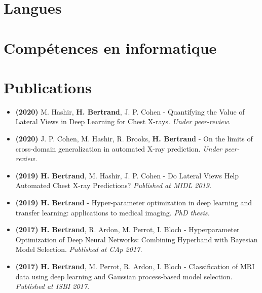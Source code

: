 \documentclass[11pt,a4paper,sans]{moderncv}        %
\begin{document}
\section{Langues}


\section{Compétences en informatique}

\section{Publications}

\begin{itemize}
    \item \textbf{(2020)} M. Hashir, \textbf{H. Bertrand}, J. P. Cohen - Quantifying the Value of Lateral Views in Deep Learning for Chest X-rays. \textit{Under peer-review.}
    \item \textbf{(2020)} J. P. Cohen, M. Hashir, R. Brooks, \textbf{H. Bertrand} - On the limits of cross-domain generalization in automated X-ray prediction. \textit{Under peer-review.}
    \item \textbf{(2019)} \textbf{H. Bertrand}, M. Hashir, J. P. Cohen - Do Lateral Views Help Automated Chest X-ray Predictions? \textit{Published at MIDL 2019.}
    \item \textbf{(2019)} \textbf{H. Bertrand} - Hyper-parameter optimization in deep learning and transfer learning: applications to medical imaging. \textit{PhD thesis.}
    \item \textbf{(2017)} \textbf{H. Bertrand}, R. Ardon, M. Perrot, I. Bloch - Hyperparameter Optimization of Deep Neural Networks: Combining Hyperband with Bayesian Model Selection. \textit{Published at CAp 2017.}
    \item \textbf{(2017)} \textbf{H. Bertrand}, M. Perrot, R. Ardon, I. Bloch - Classification of MRI data using deep learning and Gaussian process-based model selection. \textit{Published at ISBI 2017.}
\end{itemize}
\end{document}

